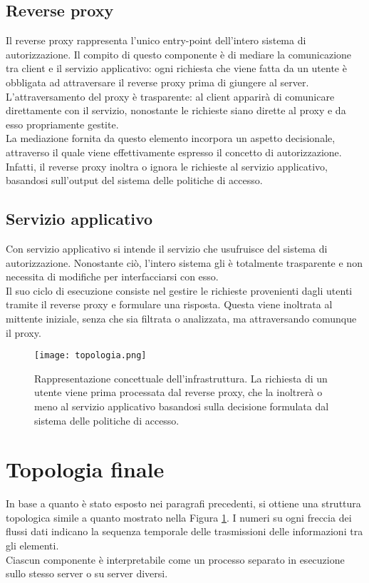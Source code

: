\subsection{Reverse proxy}
Il reverse proxy rappresenta l'unico entry-point dell'intero sistema di autorizzazione. Il compito di questo componente è di
mediare la comunicazione tra client e il servizio applicativo: ogni richiesta che viene fatta da un utente è obbligata ad attraversare 
il reverse proxy prima di giungere al server. 
\\ L'attraversamento del proxy è trasparente: al client apparirà di comunicare direttamente con il servizio, nonostante le richieste siano dirette al proxy e da esso propriamente gestite. 
\\ La mediazione fornita da questo elemento incorpora un aspetto decisionale, attraverso il quale viene effettivamente espresso il concetto di autorizzazione. 
Infatti, il reverse proxy inoltra o ignora le richieste al servizio applicativo, basandosi sull'output del sistema delle politiche di accesso.  
 

\subsection{Servizio applicativo} \label{serv_server}
Con servizio applicativo si intende il servizio che usufruisce del sistema di autorizzazione. 
Nonostante ciò, l'intero sistema gli è totalmente trasparente e non necessita di modifiche per interfacciarsi con esso.
\\Il suo ciclo di esecuzione consiste nel gestire 
le richieste provenienti dagli utenti tramite
 il reverse proxy e formulare una risposta.
Questa viene inoltrata al mittente iniziale, senza che sia filtrata o analizzata, ma attraversando comunque il proxy.

\begin{figure}[h]
    \texttt{[image: topologia.png]}
    \centering
    \caption[Rappresentazione concettuale del sistema di autorizzazione.]{Rappresentazione concettuale dell'infrastruttura. La richiesta di un utente viene prima processata dal reverse proxy, che
     la inoltrerà o meno al servizio applicativo basandosi sulla decisione formulata dal sistema delle politiche di accesso.}
    \label{topologia}
\end{figure}

\section{Topologia finale}
In base a quanto è stato esposto nei paragrafi precedenti, si ottiene una struttura topologica simile a quanto mostrato nella Figura \ref{topologia}. 
I numeri su ogni freccia dei flussi dati indicano la sequenza temporale delle trasmissioni delle informazioni tra gli elementi. 
\\Ciascun componente è interpretabile come un processo separato in esecuzione sullo stesso server o su server diversi. 
